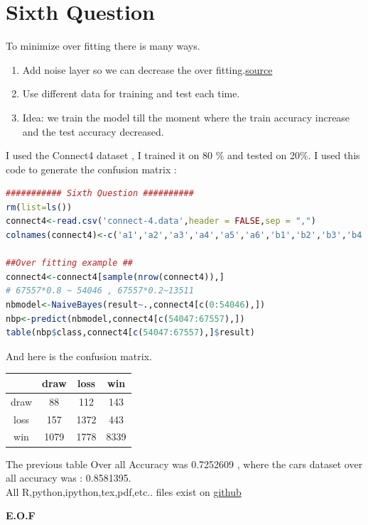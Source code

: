 \documentclass{article}
\begin{document}
\section*{Sixth Question}
To minimize over fitting there is many ways.
\begin{enumerate}
	\item Add noise layer so we can decrease the over fitting.\href{http://keras.io/layers/noise/}{source}
	\item Use different data for training and test each time.
	\item Idea: we train the model till the moment where the train accuracy increase and the test accuracy decreased.
\end{enumerate}
I used the Connect4 dataset , I trained it on 80 \% and tested on 20\%. I used this code to generate the confusion matrix :
\begin{lstlisting}[language=R]
########### Sixth Question ##########
rm(list=ls())
connect4<-read.csv('connect-4.data',header = FALSE,sep = ",")
colnames(connect4)<-c('a1','a2','a3','a4','a5','a6','b1','b2','b3','b4','b5','b6','c1','c2','c3','c4','c5','c6','d1','d2','d3','d4','d5','d6','e1','e2','e3','e4','e5','e6','f1','f2','f3','f4','f5','f6','g1','g2','g3','g4','g5','g6','result')

##Over fitting example ##
connect4<-connect4[sample(nrow(connect4)),]
# 67557*0.8 ~ 54046 , 67557*0.2~13511
nbmodel<-NaiveBayes(result~.,connect4[c(0:54046),])
nbp<-predict(nbmodel,connect4[c(54047:67557),])
table(nbp$class,connect4[c(54047:67557),]$result)
\end{lstlisting}
And here is the confusion matrix.
\begin{tabular}{|c|c|c|c|}
\hline
&draw&loss&win \\ \hline
draw&88&112&143\\ \hline
loss&157&1372&443\\ \hline
win&1079&1778&8339\\ \hline
\end{tabular}
The previous table Over all Accuracy was 0.7252609 , where the cars dataset over all accuracy was : 0.8581395.\\
All R,python,ipython,tex,pdf,etc.. files exist on \href{https://github.com/aqeel13932/DM/tree/master/HW08}{github}
\begin{center}
\textbf{ E.O.F}
\end{center}
\end{document}
